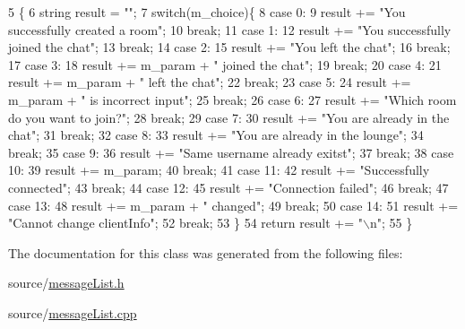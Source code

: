\begin{DoxyCode}
5                                                             \{
6     \textcolor{keywordtype}{string} result = \textcolor{stringliteral}{""};
7     \textcolor{keywordflow}{switch}(m\_choice)\{
8         \textcolor{keywordflow}{case} 0:
9             result += \textcolor{stringliteral}{"You successfully created a room"};
10             \textcolor{keywordflow}{break};
11         \textcolor{keywordflow}{case} 1:
12             result += \textcolor{stringliteral}{"You successfully joined the chat"};
13             \textcolor{keywordflow}{break};
14         \textcolor{keywordflow}{case} 2:
15             result += \textcolor{stringliteral}{"You left the chat"};
16             \textcolor{keywordflow}{break};
17         \textcolor{keywordflow}{case} 3:
18             result += m\_param + \textcolor{stringliteral}{" joined the chat"};
19             \textcolor{keywordflow}{break};
20         \textcolor{keywordflow}{case} 4:
21             result += m\_param + \textcolor{stringliteral}{" left the chat"};
22             \textcolor{keywordflow}{break};
23         \textcolor{keywordflow}{case} 5:
24             result += m\_param + \textcolor{stringliteral}{" is incorrect input"};
25             \textcolor{keywordflow}{break};
26         \textcolor{keywordflow}{case} 6:
27             result += \textcolor{stringliteral}{"Which room do you want to join?"};
28             \textcolor{keywordflow}{break};
29         \textcolor{keywordflow}{case} 7:
30             result += \textcolor{stringliteral}{"You are already in the chat"};
31             \textcolor{keywordflow}{break};
32         \textcolor{keywordflow}{case} 8:
33             result += \textcolor{stringliteral}{"You are already in the lounge"};
34             \textcolor{keywordflow}{break};
35         \textcolor{keywordflow}{case} 9:
36             result += \textcolor{stringliteral}{"Same username already exitst"};
37             \textcolor{keywordflow}{break};
38         \textcolor{keywordflow}{case} 10:
39             result += m\_param;
40             \textcolor{keywordflow}{break};
41         \textcolor{keywordflow}{case} 11:
42             result += \textcolor{stringliteral}{"Successfully connected"};
43             \textcolor{keywordflow}{break};
44         \textcolor{keywordflow}{case} 12:
45             result += \textcolor{stringliteral}{"Connection failed"};
46             \textcolor{keywordflow}{break};
47         \textcolor{keywordflow}{case} 13:
48             result += m\_param + \textcolor{stringliteral}{" changed"};
49             \textcolor{keywordflow}{break};
50         \textcolor{keywordflow}{case} 14:
51             result += \textcolor{stringliteral}{"Cannot change clientInfo"};
52             \textcolor{keywordflow}{break};
53     \} 
54     \textcolor{keywordflow}{return} result += \textcolor{stringliteral}{"\(\backslash\)n"};
55 \}
\end{DoxyCode}


The documentation for this class was generated from the following files\+:\begin{DoxyCompactItemize}
\item 
source/\hyperlink{message_list_8h}{message\+List.\+h}\item 
source/\hyperlink{message_list_8cpp}{message\+List.\+cpp}\end{DoxyCompactItemize}
